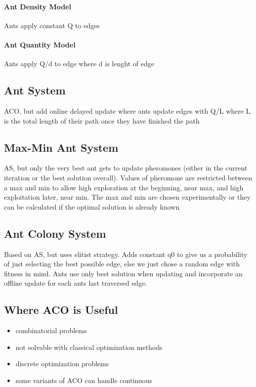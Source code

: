 \documentclass[12pt]{article}
\begin{document}
\paragraph{Ant Density Model} 
Ants apply constant Q to edges

\paragraph{Ant Quantity Model} 
Ants apply Q/d to edge where d is lenght of edge

\subsection*{Ant System}
ACO, but add online delayed update where ants update edges with Q/L where L is the total length of their path once they have finished the path

\subsection*{Max-Min Ant System}
AS, but only the very best ant gets to update pheromones (either in the current iteration or the best solution overall). Values of pheromone are restricted between a max and min to allow high exploration at the beginning, near max, and high exploitation later, near min. The max and min are chosen experimentally or they can be calculated if the optimal solution is already known

\subsection*{Ant Colony System}
Based on AS, but uses elitist strategy. Adds constant q0 to give us a probability of just selecting the best possible edge, else we just chose a random edge with fitness in mind. Ants use only best solution when updating and incorporate an offline update for each ants last traversed edge.

\subsection*{Where ACO is Useful}
\begin{itemize}
	\item combinatorial problems
	\item not solvable with classical optimization methods
	\item discrete optimization problems
	\item some variants of ACO can handle continuous 
\end{itemize}
\end{document}
